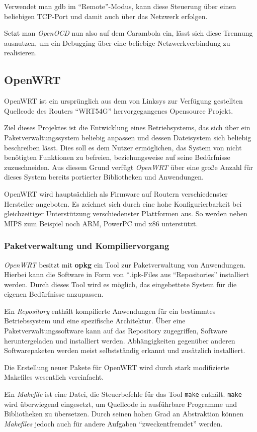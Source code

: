 Verwendet man \gls{gdb} im "`Remote"'-Modus, kann diese Steuerung über einen
beliebigen TCP-Port und damit auch über das Netzwerk erfolgen.

Setzt man \emph{OpenOCD} nun also auf dem Carambola ein, lässt sich diese Trennung
ausnutzen, um ein Debugging über eine beliebige Netzwerkverbindung zu
realisieren.
\subsection{OpenWRT}\label{subs:owrt}
OpenWRT ist ein ursprünglich aus dem von Linksys zur Verfügung
gestellten Quellcode des Routers "`WRT54G"' \cite{OWRT} hervorgegangenes
Opensource Projekt.

Ziel dieses Projektes ist die Entwicklung eines Betriebsystems, das sich
über ein Paketverwaltungssystem beliebig anpassen und dessen Dateisystem sich
beliebig beschreiben lässt. Dies soll es dem Nutzer ermöglichen, das System von
nicht benötigten Funktionen zu befreien, beziehungsweise auf seine Bedürfnisse
zuzuschneiden. Aus diesem Grund verfügt \emph{OpenWRT} über eine große Anzahl
für dieses System bereits portierter Bibliotheken und Anwendungen.

OpenWRT wird hauptsächlich als Firmware auf Routern verschiedenster Hersteller
angeboten. Es zeichnet sich durch eine hohe Konfigurierbarkeit bei
gleichzeitiger Unterstützung verschiedenster Plattformen aus. So werden neben
MIPS zum Beispiel noch ARM, PowerPC und x86 unterstützt. 

 \subsubsection*{Paketverwaltung
und Kompiliervorgang} \emph{OpenWRT} besitzt mit \textbf{opkg} ein Tool zur Paketverwaltung von
Anwendungen.
Hierbei kann die Software in Form von *.ipk-Files aus "`Repositories"'
installiert werden. Durch dieses Tool wird es möglich, das eingebettete System
für die eigenen Bedürfnisse anzupassen.
\begin{definition}[Repository]
Ein \emph{Repository} enthält kompilierte Anwendungen für ein bestimmtes
Betriebssystem und eine spezifische Architektur. Über eine
Paketverwaltungssoftware kann auf das Repository zugegriffen, Software
heruntergeladen und installiert werden. Abhängigkeiten gegenüber anderen
Softwarepaketen werden meist selbstständig erkannt und zusätzlich installiert.
\end{definition}
Die Erstellung neuer Pakete für OpenWRT wird durch stark modifizierte Makefiles
wesentlich vereinfacht.
 \begin{definition}[Makefile]
Ein \emph{Makefile} ist eine Datei, die Steuerbefehle für das Tool
\texttt{make} enthält. \texttt{make} wird überwiegend eingesetzt, um Quellcode
in ausführbare Programme und Bibliotheken zu übersetzen. Durch seinen hohen
Grad an Abstraktion können \emph{Makefiles} jedoch auch für andere Aufgaben
"`zweckentfremdet"' werden.
\end{definition}

